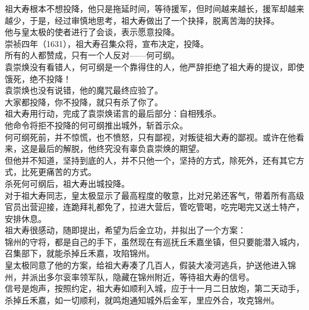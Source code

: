 \begin{multicols}{\theparacolNo}
祖大寿根本不想投降，他只是拖延时间，等待援军，但时间越来越长，援军却越来越少，于是，经过审慎地思考，祖大寿做出了一个抉择，脱离苦海的抉择。\\

他与皇太极的使者进行了会谈，表示愿意投降。\\

崇祯四年（1631），祖大寿召集众将，宣布决定，投降。\\

所有的人都赞成，只有一个人反对——何可纲。\\

袁崇焕没有看错人，何可纲是一个靠得住的人，他严辞拒绝了祖大寿的提议，即使饿死，绝不投降！\\

袁崇焕也没有说错，他的魔咒最终应验了。\\

大家都投降，你不投降，就只有杀了你了。\\

祖大寿用行动，完成了袁崇焕诺言的最后部分：自相残杀。\\

他命令将拒不投降的何可纲推出城外，斩首示众。\\

何可纲死前，并不惊慌，也不愤怒，只有鄙视，对叛徒祖大寿的鄙视。或许在他看来，这是最后的解脱，他终究没有辜负袁崇焕的期望。\\

但他并不知道，坚持到底的人，并不只他一个，坚持的方式，除死外，还有其它方式，比死更痛苦的方式。\\

杀死何可纲后，祖大寿出城投降。\\

对于祖大寿同志，皇太极显示了最高程度的敬意，比对兄弟还客气，带着所有高级官员出营迎接，连跪拜礼都免了，拉进大营后，管吃管喝，吃完喝完又送土特产，安排休息。\\

祖大寿很感动，随即提出，希望为后金立功，并拟出了一个方案：\\

锦州的守将，都是自己的手下，虽然现在有巡抚丘禾嘉坐镇，但只要能潜入城内，召集部下，就能杀掉丘禾嘉，攻陷锦州。\\

皇太极同意了他的方案，给祖大寿凑了几百人，假装大凌河逃兵，护送他进入锦州，并派出多尔衮率领军队，隐藏在锦州附近，等待祖大寿的信号。\\

信号是炮声，按照约定，祖大寿如顺利入城，应于十一月二日放炮，第二天动手，杀掉丘禾嘉，如一切顺利，就鸣炮通知城外后金军，里应外合，攻克锦州。\\


\end{multicols}
